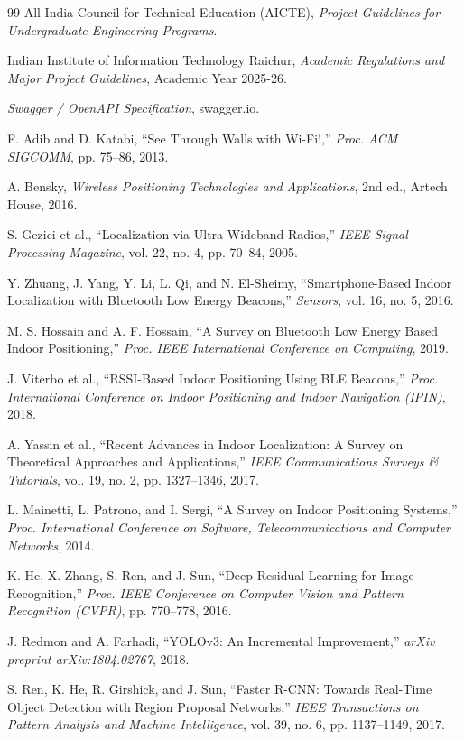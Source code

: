 \documentclass[12pt, a4paper, oneside]{report}
\begin{document}
\begin{thebibliography}{99}
 All India Council for Technical Education (AICTE), \textit{Project Guidelines for Undergraduate Engineering Programs}.

 Indian Institute of Information Technology Raichur, \textit{Academic Regulations and Major Project Guidelines}, Academic Year 2025-26.

 \textit{Swagger / OpenAPI Specification}, swagger.io.

 F. Adib and D. Katabi, ``See Through Walls with Wi-Fi!,'' \textit{Proc. ACM SIGCOMM}, pp. 75--86, 2013.

 A. Bensky, \textit{Wireless Positioning Technologies and Applications}, 2nd ed., Artech House, 2016.

 S. Gezici et al., ``Localization via Ultra-Wideband Radios,'' \textit{IEEE Signal Processing Magazine}, vol. 22, no. 4, pp. 70--84, 2005.

 Y. Zhuang, J. Yang, Y. Li, L. Qi, and N. El-Sheimy, ``Smartphone-Based Indoor Localization with Bluetooth Low Energy Beacons,'' \textit{Sensors}, vol. 16, no. 5, 2016.

 M. S. Hossain and A. F. Hossain, ``A Survey on Bluetooth Low Energy Based Indoor Positioning,'' \textit{Proc. IEEE International Conference on Computing}, 2019.

 J. Viterbo et al., ``RSSI-Based Indoor Positioning Using BLE Beacons,'' \textit{Proc. International Conference on Indoor Positioning and Indoor Navigation (IPIN)}, 2018.

 A. Yassin et al., ``Recent Advances in Indoor Localization: A Survey on Theoretical Approaches and Applications,'' \textit{IEEE Communications Surveys \& Tutorials}, vol. 19, no. 2, pp. 1327--1346, 2017.

 L. Mainetti, L. Patrono, and I. Sergi, ``A Survey on Indoor Positioning Systems,'' \textit{Proc. International Conference on Software, Telecommunications and Computer Networks}, 2014.

 K. He, X. Zhang, S. Ren, and J. Sun, ``Deep Residual Learning for Image Recognition,'' \textit{Proc. IEEE Conference on Computer Vision and Pattern Recognition (CVPR)}, pp. 770--778, 2016.

 J. Redmon and A. Farhadi, ``YOLOv3: An Incremental Improvement,'' \textit{arXiv preprint arXiv:1804.02767}, 2018.

 S. Ren, K. He, R. Girshick, and J. Sun, ``Faster R-CNN: Towards Real-Time Object Detection with Region Proposal Networks,'' \textit{IEEE Transactions on Pattern Analysis and Machine Intelligence}, vol. 39, no. 6, pp. 1137--1149, 2017.


\end{thebibliography}
\end{document}
